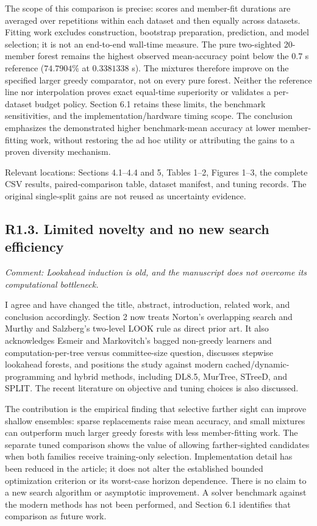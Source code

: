 \documentclass[11pt]{article}
\newcommand{\comment}[1]{\textit{Comment: #1}}
\begin{document}
The scope of this comparison is precise: scores and member-fit durations
are averaged over repetitions within each dataset and then equally across
datasets. Fitting work excludes construction, bootstrap preparation,
prediction, and model selection; it is not an end-to-end wall-time measure.
The pure two-sighted 20-member forest remains the highest observed
mean-accuracy point below the $0.7$ s reference ($74.7904\%$ at
$0.3381338$ s). The mixtures therefore improve on the specified larger
greedy comparator, not on every pure forest. Neither the reference line
nor interpolation proves exact equal-time superiority or validates a
per-dataset budget policy. Section 6.1 retains these limits, the benchmark
sensitivities, and the implementation/hardware timing scope. The conclusion
emphasizes the demonstrated higher benchmark-mean accuracy at lower
member-fitting work, without restoring the ad hoc utility or attributing
the gains to a proven diversity mechanism.

Relevant locations: Sections 4.1--4.4 and 5, Tables 1--2, Figures 1--3, the complete CSV results, paired-comparison table, dataset manifest, and tuning records. The original single-split gains are not reused as uncertainty evidence.

\subsection*{R1.3. Limited novelty and no new search efficiency}
\comment{Lookahead induction is old, and the manuscript does not overcome its computational bottleneck.}

I agree and have changed the title, abstract, introduction, related work, and conclusion accordingly. Section 2 now treats Norton's overlapping search and Murthy and Salzberg's two-level LOOK rule as direct prior art. It also acknowledges Esmeir and Markovitch's bagged non-greedy learners and computation-per-tree versus committee-size question, discusses stepwise lookahead forests, and positions the study against modern cached/dynamic-programming and hybrid methods, including DL8.5, MurTree, STreeD, and SPLIT. The recent literature on objective and tuning choices is also discussed.

The contribution is the empirical finding that selective farther sight can improve shallow ensembles: sparse replacements raise mean accuracy, and small mixtures can outperform much larger greedy forests with less member-fitting work. The separate tuned comparison shows the value of allowing farther-sighted candidates when both families receive training-only selection. Implementation detail has been reduced in the article; it does not alter the established bounded optimization criterion or its worst-case horizon dependence. There is no claim to a new search algorithm or asymptotic improvement. A solver benchmark against the modern methods has not been performed, and Section 6.1 identifies that comparison as future work.
\end{document}
